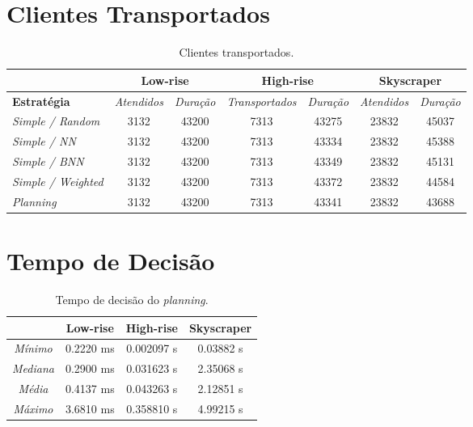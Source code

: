 \section{Clientes Transportados}

\begin{table}[htb]
\centering
\caption{Clientes transportados.}
\label{table:results:clients}
\begin{tabular}{|l|c|c|c|c|c|c|}
\hline
\textbf{}                  & \multicolumn{2}{c|}{\textbf{Low-rise}} & \multicolumn{2}{c|}{\textbf{High-rise}} & \multicolumn{2}{c|}{\textbf{Skyscraper}} \\ \hline
\textbf{Estratégia}        & \textit{Atendidos}  & \textit{Duração} & \textit{Transportados}  & \textit{Duração}  & \textit{Atendidos}   & \textit{Duração}  \\ \hline
\textit{Simple / Random}   & 3132                & 43200            & 7313                & 43275             & 23832                & 45037             \\ \hline
\textit{Simple / NN}       & 3132                & 43200            & 7313                & 43334             & 23832                & 45388             \\ \hline
\textit{Simple / BNN}      & 3132                & 43200            & 7313                & 43349             & 23832                & 45131             \\ \hline
\textit{Simple / Weighted} & 3132                & 43200            & 7313                & 43372             & 23832                & 44584             \\ \hline
\textit{Planning}          & 3132                & 43200            & 7313                & 43341             & 23832                & 43688             \\ \hline
\end{tabular}
\end{table}

\section{Tempo de Decisão}

\begin{table}[htb]
\centering
\caption{Tempo de decisão do \textit{planning}.}
\label{table:results:skyscraper:time}
\begin{tabular}{|c|c|c|c|}
\hline
                 & \textbf{Low-rise} & \textbf{High-rise} & \textbf{Skyscraper} \\ \hline
\textit{Mínimo}  & 0.2220 ms         & 0.002097 s         & 0.03882 s           \\ \hline
\textit{Mediana} & 0.2900 ms         & 0.031623 s         & 2.35068 s           \\ \hline
\textit{Média}   & 0.4137 ms         & 0.043263 s         & 2.12851 s           \\ \hline
\textit{Máximo}  & 3.6810 ms         & 0.358810 s         & 4.99215 s           \\ \hline
\end{tabular}
\end{table}


